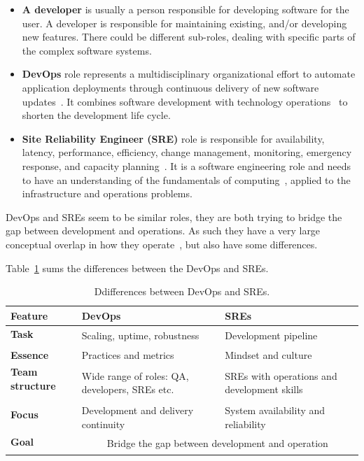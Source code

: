\begin{itemize}
	\item \textbf{A developer} is usually a person responsible for developing software for the user. A developer is responsible for maintaining existing, and/or developing new features. There could be different sub-roles, dealing with specific parts of the complex software systems.
	\item \textbf{DevOps} role represents a multidisciplinary organizational effort to automate application deployments through continuous delivery of new software updates~\cite{LeiteRKMM20}. It combines software development with technology operations~\cite{JabbariAPT16} to shorten the development life cycle.
	\item \textbf{Site Reliability Engineer (SRE)} role is responsible for availability, latency, performance, efficiency, change management, monitoring, emergency response, and capacity planning~\cite{beyer2016site}. It is a software engineering role and needs to have an understanding of the fundamentals of computing~\cite{JonesUN15}, applied to the infrastructure and operations problems.
\end{itemize}

\noindent
DevOps and SREs seem to be similar roles, they are both trying to bridge the gap between development and operations. As such they have a very large conceptual overlap in how they operate~\cite{46939}, but also have some differences. 

Table~\ref{tab:table10} sums the differences between the DevOps and SREs.

\begin{table}[H]
	\begin{center}
		\begin{tabular}{l|l|l}
			\textbf{Feature} & \textbf{DevOps} & \textbf{SREs}\\
			\hline
			\textbf{Task} & \multirow{2}{10em}{Scaling, uptime, robustness} & \multirow{2}{10em}{Development pipeline} \\
			& & \\
			\textbf{Essence} & Practices and metrics &  Mindset and culture \\
			\textbf{Team structure} & \multirow{3}{10em}{Wide range of roles: QA, developers, SREs etc.} &  \multirow{3}{10em}{SREs with operations and development skills} \\
			&  &  \\
			&  &  \\
			\textbf{Focus} & \multirow{2}{10em}{Development and delivery continuity} & \multirow{2}{10em}{System availability and reliability} \\
			&  &  \\
			\hline
			\textbf{Goal} & \multicolumn{2}{c}{\multirow{2}{15em}{Bridge the gap between development and operation}} \\
			&  &  \\
		\end{tabular}
	\end{center}
	\vspace{-0.5cm}
	\caption{Ddifferences between DevOps and SREs.}
	\label{tab:table10}
\end{table}

